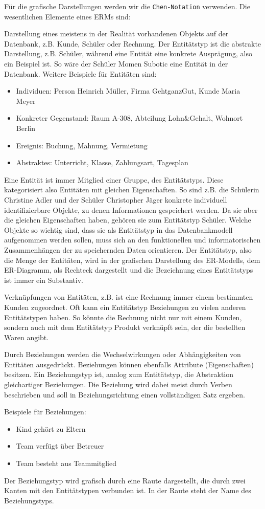 Für die grafische Darstellungen werden wir die \texttt{Chen-Notation} verwenden. Die wesentlichen Elemente eines ERMs sind:
\begin{tcolorbox}[title=Entitätstypen und Entitäten]
	Darstellung eines meistens in der Realität vorhandenen Objekts auf der Datenbank, z.B. Kunde, Schüler oder Rechnung. Der Entitätstyp ist die abstrakte Darstellung, z.B. Schüler, während eine Entität eine konkrete Ausprägung, also ein Beispiel ist. So wäre der Schüler Momen Subotic eine Entität in der Datenbank.
	Weitere Beispiele für Entitäten sind:
	\begin{itemize}
		\item Individuen: Person Heinrich Müller, Firma GehtganzGut, Kunde Maria Meyer
		\item Konkreter Gegenstand: Raum A-308, Abteilung Lohn\&Gehalt, Wohnort Berlin
		\item Ereignis: Buchung, Mahnung, Vermietung
		\item Abstraktes: Unterricht, Klasse, Zahlungsart, Tagesplan
	\end{itemize}
	Eine Entität ist immer Mitglied einer Gruppe, des Entitätstyps. Diese kategorisiert also Entitäten mit gleichen Eigenschaften. So sind z.B. die Schülerin Christine Adler und der Schüler Christopher Jäger konkrete individuell identifizierbare Objekte, zu denen Informationen gespeichert werden. Da sie aber die gleichen Eigenschaften haben, gehören sie zum Entitätstyp Schüler. Welche Objekte so wichtig sind, dass sie als Entitätstyp in das Datenbankmodell aufgenommen werden sollen, muss sich an den funktionellen und informatorischen Zusammenhängen der zu speichernden Daten orientieren.
	Der Entitätstyp, also die Menge der Entitäten, wird in der grafischen Darstellung des ER-Modells, dem ER-Diagramm, als Rechteck dargestellt und die Bezeichnung eines Entitätstyps ist immer ein Substantiv.
\end{tcolorbox}
\begin{tcolorbox}[title=Beziehungen]
	Verknüpfungen von Entitäten, z.B. ist eine Rechnung immer einem bestimmten Kunden zugeordnet. Oft kann ein Entitätstyp Beziehungen zu vielen anderen Entitätstypen haben. So könnte die Rechnung nicht nur mit einem Kunden, sondern auch mit dem Entitätstyp Produkt verknüpft sein, der die bestellten Waren angibt.

	Durch Beziehungen werden die Wechselwirkungen oder Abhängigkeiten von Entitäten ausgedrückt. Beziehungen können ebenfalls Attribute (Eigenschaften) besitzen. Ein Beziehungstyp ist, analog zum Entitätstyp, die Abstraktion gleichartiger Beziehungen. Die Beziehung wird dabei meist durch Verben beschrieben und soll in Beziehungsrichtung einen vollständigen Satz ergeben.

	Beispiele für Beziehungen:
	\begin{itemize}
		\item Kind gehört zu Eltern
		\item Team verfügt über Betreuer
		\item Team besteht aus Teammitglied
	\end{itemize}
	Der Beziehungstyp wird grafisch durch eine Raute dargestellt, die durch zwei Kanten mit den Entitätstypen verbunden ist. In der Raute steht der Name des Beziehungstyps.
\end{tcolorbox}
